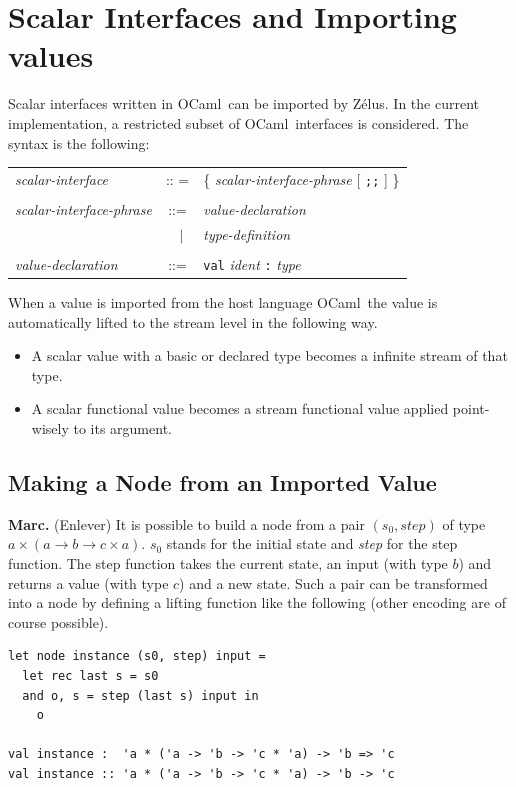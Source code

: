 \documentclass[11pt,titlepage,twoside]{report}
\newcommand{\zelus}{{\sf Z\'elus}}
\newcommand{\ocaml}{{\sf OCaml}}
\newcommand{\alt}{\;|\;}
\newcommand{\Semisemi}{\mbox{{\tt ;;}}}
\newcommand{\Marc}[1]{{\bf Marc.} ({#1})}
\newcommand{\term}[1]{{\tt #1}}
\newcommand{\nterm}[1]{{\em #1}}
\begin{document}
\section{Scalar Interfaces and Importing values}
Scalar interfaces written in \ocaml\ can be imported by \zelus. In the
current implementation, a restricted subset of \ocaml\ interfaces is
considered. The syntax is the following:
\begin{center}
\begin{tabular}{lcl}
\nterm{scalar-interface}
  & :: =   & \{ \nterm{scalar-interface-phrase} [ \term{\Semisemi} ] \} 
\\ \\
\nterm{scalar-interface-phrase}
  & ::=        & \nterm{value-declaration} \\
  & $\;\;\alt$ & \nterm{type-definition}
\\ \\
\nterm{value-declaration}
  & ::=        & \term{val} \nterm{ident} \term{:} \nterm{type}
\end{tabular}
\end{center}
When a value is imported from the host language \ocaml\ the
value is automatically lifted to the stream level in the following way.
\begin{itemize}
\item A scalar value with a basic or declared type becomes a infinite
  stream of that type.
\item A scalar functional value becomes a stream functional value
  applied point-wisely to its argument.
\end{itemize}

\subsection{Making a Node from an Imported Value}
\Marc{Enlever}
It is possible to build a node from a pair $(s_0, \mathit{step})$ of type $a
\times (a \rightarrow b \rightarrow c \times a)$. $s_0$ stands for the
initial state and \textit{step} for the step function. The step function
takes the current state, an input (with type $b$) and returns a value
(with type $c$) and a new state. Such a pair can be transformed into a
node by defining a lifting function like the following (other encoding
are of course possible).

\begin{verbatim}
let node instance (s0, step) input =
  let rec last s = s0
  and o, s = step (last s) input in
    o

val instance :  'a * ('a -> 'b -> 'c * 'a) -> 'b => 'c
val instance :: 'a * ('a -> 'b -> 'c * 'a) -> 'b -> 'c
\end{verbatim}
\end{document}

